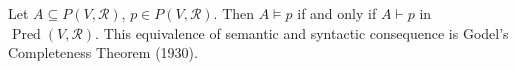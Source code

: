 Let $A \subseteq P(V, \mathcal{R})$, $p \in P(V, \mathcal{R})$. Then $A \models p$ if and only if $A \vdash p$ in $\operatorname{Pred}(V, \mathcal{R})$. This equivalence of semantic and syntactic consequence is Godel's Completeness Theorem (1930).
